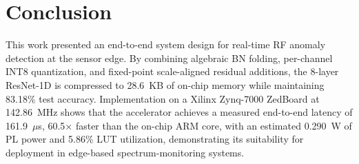 \documentclass[conference]{IEEEtran}
\begin{document}
\section{Conclusion}
This work presented an end-to-end system design for real-time RF anomaly detection at the sensor edge. By combining algebraic BN folding, per-channel INT8 quantization, and fixed-point scale-aligned residual additions, the 8-layer ResNet-1D is compressed to 28.6~KB of on-chip memory while maintaining 83.18\% test accuracy. Implementation on a Xilinx Zynq-7000 ZedBoard at 142.86~MHz shows that the accelerator achieves a measured end-to-end latency of 161.9~$\mu$s, 60.5$\times$ faster than the on-chip ARM core, with an estimated 0.290~W of PL power and 5.86\% LUT utilization, demonstrating its suitability for deployment in edge-based spectrum-monitoring systems.

\end{document}
